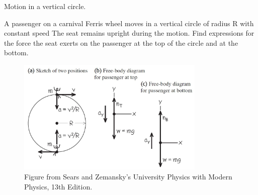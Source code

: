\documentclass[]{beamer}
\begin{document}
     









   \begin{frame}
  Motion in a vertical circle.
   \vspace{3mm}
  
   A passenger on a carnival Ferris wheel moves in a vertical circle of
   radius R with constant speed The seat remains upright during
   the motion. Find expressions for the force the seat exerts on the
   passenger at the top of the circle and at the bottom.
  
  
    \begin{figure}[h!]  
      \includegraphics[width=0.8\textwidth]{images/f28.jpg}
      \caption{ {\tiny Figure from Sears and Zemansky's University Physics 
      with Modern Physics, 13th Edition.} }
    \end{figure}
  
  
  
     \end{frame}




\end{document}

